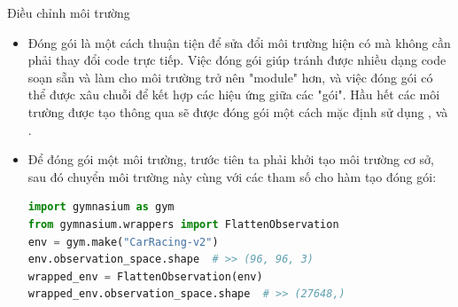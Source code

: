 \documentclass[10pt,aspectratio=169]{beamer}
\begin{document}
\begin{frame}[fragile]{Điều chỉnh môi trường}{\subsecname}
\begin{itemize}
\setlength\itemsep{8pt}
\item Đóng gói là một cách thuận tiện để sửa đổi môi trường hiện có mà không cần phải thay đổi code trực tiếp. Việc đóng gói giúp tránh được nhiều dạng code soạn sẵn và làm cho môi trường trở nên "module" hơn, và việc đóng gói có thể được xâu chuỗi để kết hợp các hiệu ứng giữa các "gói". Hầu hết các môi trường được tạo thông qua  sẽ được đóng gói một cách mặc định sử dụng ,  và .
\item Để đóng gói một môi trường, trước tiên ta phải khởi tạo môi trường cơ sở, sau đó chuyển môi trường này cùng với các tham số cho hàm tạo đóng gói:\\
\scriptsize
\begin{lstlisting}[language=Python]
import gymnasium as gym
from gymnasium.wrappers import FlattenObservation
env = gym.make("CarRacing-v2")
env.observation_space.shape  # >> (96, 96, 3)
wrapped_env = FlattenObservation(env)
wrapped_env.observation_space.shape  # >> (27648,)
\end{lstlisting}
\end{itemize}
\end{frame}
\end{document}
